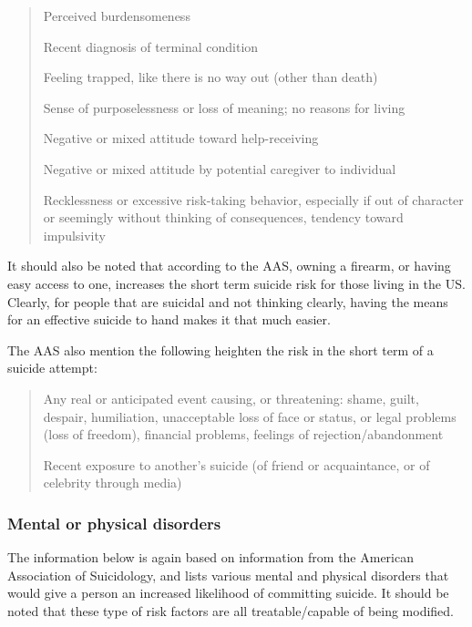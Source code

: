 \documentclass[12pt]{article}
\begin{document}
\begin{verse}
Perceived burdensomeness

Recent diagnosis of terminal condition

Feeling trapped, like there is no way out (other than death)

Sense of purposelessness or loss of meaning; no reasons for living

Negative or mixed attitude toward help-receiving

Negative or mixed attitude by potential caregiver to individual

Recklessness or excessive risk-taking behavior, especially if out of character or seemingly without thinking of consequences, tendency toward impulsivity
\end{verse}

It should also be noted that according to the AAS, owning a firearm, or having easy access to one, increases the short term suicide risk for those living in the US. Clearly, for people that are suicidal and not thinking clearly, having the means for an effective suicide to hand makes it that much easier.

The AAS also mention the following heighten the risk in the short term of a suicide attempt:

\begin{verse}
Any real or anticipated event causing, or threatening: shame, guilt, despair, humiliation, unacceptable loss of face or status, or legal problems (loss of freedom), financial problems, feelings of rejection/abandonment

Recent exposure to another's suicide (of friend or acquaintance, or of celebrity through media)
\end{verse}

\subsubsection{Mental or physical disorders}

The information below is again based on information from the American Association of Suicidology, and lists various mental and physical disorders that would give a person an increased likelihood of committing suicide. It should be noted that these type of risk factors are all treatable/capable of being modified.
\end{document}
